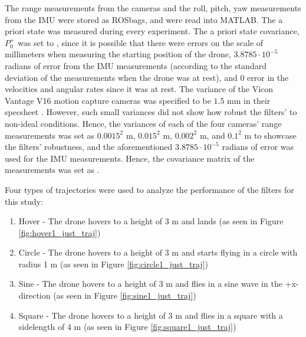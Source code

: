 \documentclass[letterpaper, preprint, paper,11pt]{AAS}	%
\begin{document}
The range measurements from the cameras and the roll, pitch, yaw measurements from the IMU were stored as ROSbags, and were read into MATLAB. The a priori state was measured during every experiment. The a priori state covariance, $P_0^+$ was set to , since it is possible that there were errors on the scale of millimeters when measuring the starting position of the drone, $3.8785\cdot 10^{-5}$ radians of error from the IMU measurements (according to the standard deviation of the measurements when the drone was at rest), and 0 error in the velocities and angular rates since it was at rest. The variance of the Vicon Vantage V16 motion capture cameras was specified to be $1.5$ mm in their specsheet \cite{vicon_2022}. However, such small variances did not show how robust the filters' to non-ideal conditions. Hence, the variances of each of the four cameras' range measurements was set as $0.0015^2$ m, $0.015^2$ m, $0.002^2$ m, and $0.1^2$ m to showcase the filters' robustness, and the aforementioned $3.8785\cdot 10^{-5}$ radians of error was used for the IMU measurements. Hence, the covariance matrix of the measurements was set as .

Four types of trajectories were used to analyze the performance of the filters for this study:
\begin{enumerate}[label=(\alph*)]
\item Hover - The drone hovers to a height of 3 m and lands (as seen in Figure \ref{fig:hover1_just_traj})
\item Circle - The drone hovers to a height of 3 m and starts flying in a circle with radius 1 m (as seen in Figure \ref{fig:circle1_just_traj})
\item Sine - The drone hovers to a height of 3 m and flies in a sine wave in the +x-direction (as seen in Figure \ref{fig:sine1_just_traj})
\item Square - The drone hovers to a height of 3 m and flies in a square with a sidelength of 4 m (as seen in Figure \ref{fig:square1_just_traj})
\end{enumerate}
\end{document}
